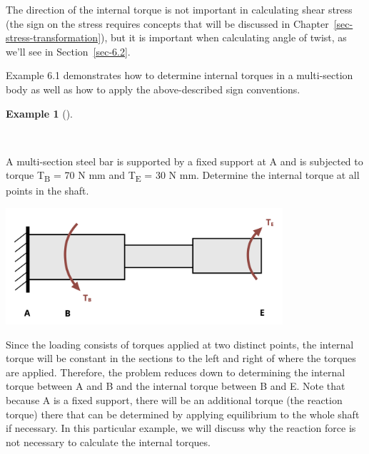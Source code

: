 \documentclass[
  letterpaper,
  DIV=11,
  numbers=noendperiod]{scrreprt}
\theoremstyle{definition}
\newtheorem{example}{Example}[chapter]
\theoremstyle{remark}
\begin{document}
The direction of the internal torque is not important in calculating
shear stress (the sign on the stress requires concepts that will be
discussed in Chapter~\ref{sec-stress-transformation}), but it is
important when calculating angle of twist, as we'll see in
Section~\ref{sec-6.2}.

Example 6.1 demonstrates how to determine internal torques in a
multi-section body as well as how to apply the above-described sign
conventions.

\begin{tcolorbox}[enhanced jigsaw, colback=white, colframe=quarto-callout-tip-color-frame, toptitle=1mm, arc=.35mm, bottomrule=.15mm, toprule=.15mm, opacitybacktitle=0.6, title={Example 6.1}, coltitle=black, breakable, colbacktitle=quarto-callout-tip-color!10!white, bottomtitle=1mm, titlerule=0mm, opacityback=0, leftrule=.75mm, left=2mm, rightrule=.15mm]

\begin{example}[]\protect\hypertarget{exm-6.1}{}\label{exm-6.1}

~

A multi-section steel bar is supported by a fixed support at A and is
subjected to torque T\textsubscript{B} = 70 N mm and T\textsubscript{E}
= 30 N mm. Determine the internal torque at all points in the shaft.

\begin{center}
\includegraphics[width=4.04167in,height=\textheight]{images/CH6 PNGs/example 6.1 part 1.png}
\end{center}

\begin{tcolorbox}[enhanced jigsaw, colback=white, colframe=quarto-callout-tip-color-frame, toptitle=1mm, arc=.35mm, bottomrule=.15mm, toprule=.15mm, opacitybacktitle=0.6, title={Solution}, coltitle=black, breakable, colbacktitle=quarto-callout-tip-color!10!white, bottomtitle=1mm, titlerule=0mm, opacityback=0, leftrule=.75mm, left=2mm, rightrule=.15mm]

Since the loading consists of torques applied at two distinct points,
the internal torque will be constant in the sections to the left and
right of where the torques are applied. Therefore, the problem reduces
down to determining the internal torque between A and B and the internal
torque between B and E. Note that because A is a fixed support, there
will be an additional torque (the reaction torque) there that can be
determined by applying equilibrium to the whole shaft if necessary. In
this particular example, we will discuss why the reaction force is not
necessary to calculate the internal torques.~


\end{tcolorbox}
\end{example}
\end{tcolorbox}
\end{document}
